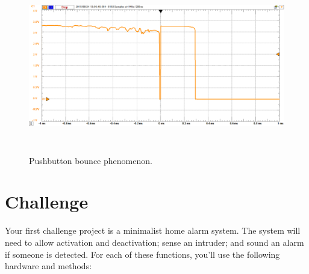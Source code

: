 \documentclass[11pt]{article} %
\begin{document}
\begin{figure}
\centering
\includegraphics[height=3in ]{figures/bouncing}
\caption{Pushbutton bounce phenomenon.}
\label{fig:bouncing}
\end{figure}

\clearpage
\section*{Challenge}

Your first challenge project is a minimalist home alarm system. The system will need to allow activation and deactivation; sense an intruder; and sound an alarm if someone is detected. For each of these functions, you’ll use the following hardware and methods:
\end{document}
